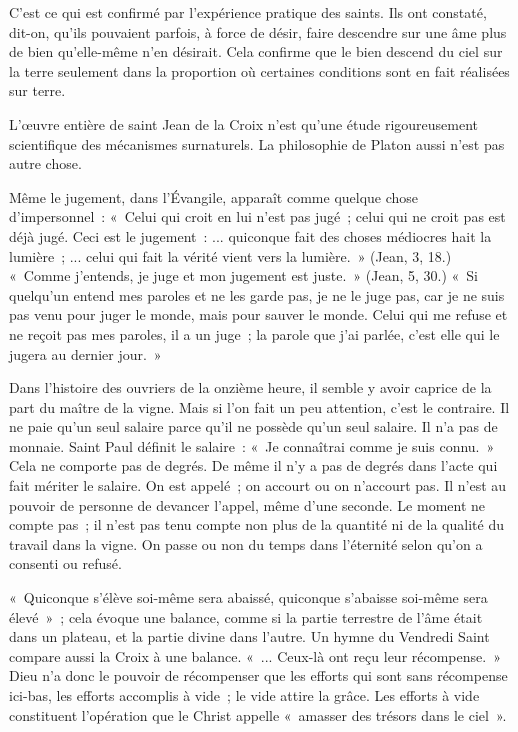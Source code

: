 \documentclass[french,twoside]{book} %
\begin{document}
C'est ce qui est confirmé par l'expérience pratique des saints. Ils ont constaté, dit-on, qu'ils pouvaient parfois, à force de désir, faire descendre sur une âme plus de bien qu'elle-même n'en désirait. Cela confirme que le bien descend du ciel sur la terre seulement dans la proportion où certaines conditions sont en fait réalisées sur terre.\par
L'œuvre entière de saint Jean de la Croix n'est qu'une étude rigoureusement scientifique des mécanismes surnaturels. La philosophie de Platon aussi n'est pas autre chose.\par
Même le jugement, dans l'Évangile, apparaît comme quelque chose d'impersonnel : « Celui qui croit en lui n'est pas jugé ; celui qui ne croit pas est déjà jugé. Ceci est le jugement : ... quiconque fait des choses médiocres hait la lumière ; ... celui qui fait la vérité vient vers la lumière. » (Jean, 3, 18.) « Comme j'entends, je juge et mon jugement est juste. » (Jean, 5, 30.) « Si quelqu'un entend mes paroles et ne les garde pas, je ne le juge pas, car je ne suis pas venu pour juger le monde, mais pour sauver le monde. Celui qui me refuse et ne reçoit pas mes paroles, il a un juge ; la parole que j'ai parlée, c'est elle qui le jugera au dernier jour. »\par
Dans l'histoire des ouvriers de la onzième heure, il semble y avoir caprice de la part du maître de la vigne. Mais si l'on fait un peu attention, c'est le contraire. Il ne paie qu'un seul salaire parce qu'il ne possède qu'un seul salaire. Il n'a pas de monnaie. Saint Paul définit le salaire : « Je connaîtrai comme je suis connu. » Cela ne comporte pas de degrés. De même il n'y a pas de degrés dans l'acte qui fait mériter le salaire. On est appelé ; on accourt ou on n'accourt pas. Il n'est au pouvoir de personne de devancer l'appel, même d'une seconde. Le moment ne compte pas ; il n'est pas tenu compte non plus de la quantité ni de la qualité du travail dans la vigne. On passe ou non du temps dans l'éternité selon qu'on a consenti ou refusé.\par
« Quiconque s'élève soi-même sera abaissé, quiconque s'abaisse soi-même sera élevé » ; cela évoque une balance, comme si la partie terrestre de l'âme était dans un plateau, et la partie divine dans l'autre. Un hymne du Vendredi Saint compare aussi la Croix à une balance. « ... Ceux-là ont reçu leur récompense. » Dieu n'a donc le pouvoir de récompenser que les efforts qui sont sans récompense ici-bas, les efforts accomplis à vide ; le vide attire la grâce. Les efforts à vide constituent l'opération que le Christ appelle « amasser des trésors dans le ciel ».\par
\end{document}

